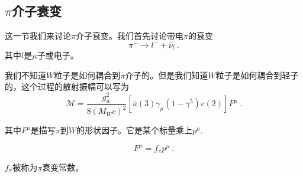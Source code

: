 

\subsection*{$\pi$介子衰变} 
这一节我们来讨论$\pi$介子衰变。我们首先讨论带电$\pi$的衰变 
\begin{equation}
\pi^- \rightarrow l^- + \bar \nu_l~.
\end{equation}
其中$l$是$\mu$子或电子。

我们不知道$W$粒子是如何耦合到$\pi$介子的。但是我们知道$W$粒子是如何耦合到轻子的，这个过程的散射振幅可以写为
\begin{equation}
\mathcal M = \frac{g_w^2}{8(M_W c)^2} [\bar u (3) \gamma_\mu (1-\gamma^5)v(2)] F^\mu~.
\end{equation}

其中$F^\mu$是描写$\pi$到$W$的形状因子。它是某个标量乘上$p^\mu$.

\begin{equation}
F^\mu = f_\pi p^\mu~. 
\end{equation}

$f_\pi$被称为$\pi$衰变常数。